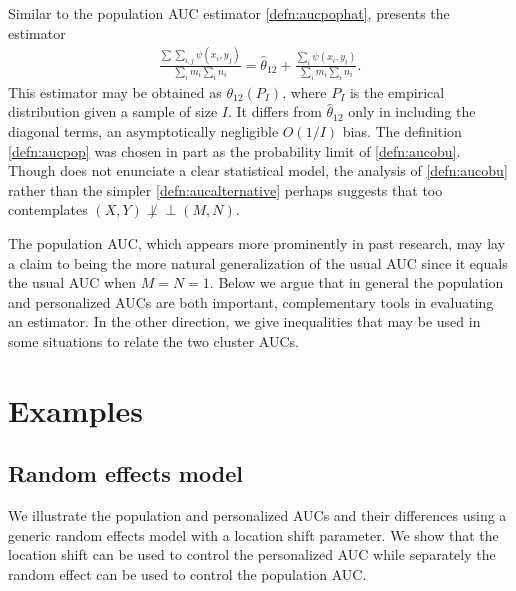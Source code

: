 \documentclass[12pt]{article}
\DeclareMathOperator{\AUC}{AUC}
\newcommand{\I}{I}
\renewcommand{\P}{P}
\newcommand{\cind}{\perp \!\!\! \perp}
\newcommand{\aucpop}{\theta_{12}}%
\newcommand{\aucpophat}{\hat{\theta}_{12}}%
\begin{document}
  Similar to the population AUC estimator \eqref{defn:aucpophat}, \citet{obuchowski1997} presents the estimator
  \begin{align}
  \frac{\sum\sum_{i,
      j}\psi(x_i,y_j)}{\sum_im_i\sum_in_i} = \aucpophat +\frac{\sum_i\psi(x_i,y_i)}{\sum_im_i\sum_in_i}.\label{defn:aucobu}
  \end{align}
   This estimator may be obtained as $\aucpop(\P_{\I})$, where
   $\P_{\I}$ is the empirical distribution given a sample of size
   $\I$. It differs from $\aucpophat$ only in including the diagonal
   terms, an asymptotically negligible $O(1/\I)$ bias. The definition
   \eqref{defn:aucpop} was chosen in part as the probability limit of
  \eqref{defn:aucobu}. Though \citet{obuchowski1997} does not enunciate
  a clear statistical model, the analysis of \eqref{defn:aucobu} rather
  than the simpler \eqref{defn:aucalternative} perhaps suggests that
  \citet{obuchowski1997} too contemplates $(X,Y)\not\cind (M,N)$.




  The population AUC, which appears more prominently in past research,
  may lay a claim to being the more natural generalization of the
  usual AUC since it equals the usual AUC when $M=N=1$. Below we argue
  that in general the population and personalized AUCs are both
  important, complementary tools in evaluating an estimator. In the
  other direction, we give inequalities that may be used in some
  situations to relate the two cluster AUCs.




\section{Examples}\label{section:examples} 

\subsection{Random effects model}\label{section:examples:random effects}
We illustrate the population and personalized AUCs
and their differences using a generic random effects model with a
location shift parameter. We show that the location shift can be
used to control the personalized AUC while separately the random effect can be used 
to control the population AUC.
\end{document}
